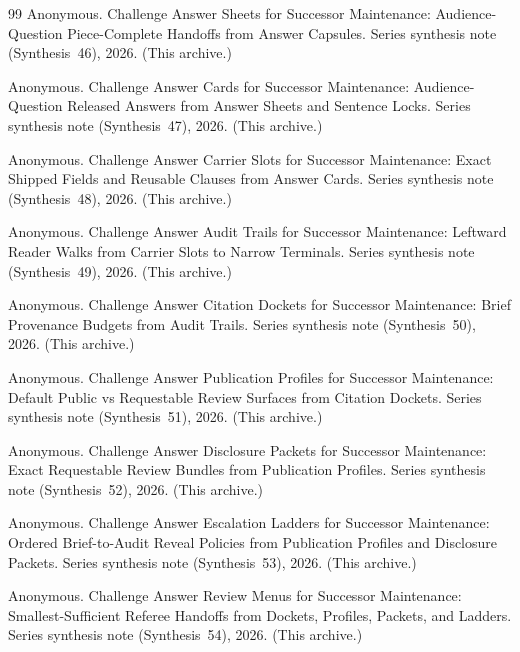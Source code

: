 \documentclass[11pt]{article}
\begin{document}
\begin{thebibliography}{99}
Anonymous.
\newblock Challenge Answer Sheets for Successor Maintenance: Audience-Question Piece-Complete Handoffs from Answer Capsules.
\newblock Series synthesis note (Synthesis~46), 2026. (This archive.)

Anonymous.
\newblock Challenge Answer Cards for Successor Maintenance: Audience-Question Released Answers from Answer Sheets and Sentence Locks.
\newblock Series synthesis note (Synthesis~47), 2026. (This archive.)

Anonymous.
\newblock Challenge Answer Carrier Slots for Successor Maintenance: Exact Shipped Fields and Reusable Clauses from Answer Cards.
\newblock Series synthesis note (Synthesis~48), 2026. (This archive.)

Anonymous.
\newblock Challenge Answer Audit Trails for Successor Maintenance: Leftward Reader Walks from Carrier Slots to Narrow Terminals.
\newblock Series synthesis note (Synthesis~49), 2026. (This archive.)

Anonymous.
\newblock Challenge Answer Citation Dockets for Successor Maintenance: Brief Provenance Budgets from Audit Trails.
\newblock Series synthesis note (Synthesis~50), 2026. (This archive.)

Anonymous.
\newblock Challenge Answer Publication Profiles for Successor Maintenance: Default Public vs Requestable Review Surfaces from Citation Dockets.
\newblock Series synthesis note (Synthesis~51), 2026. (This archive.)

Anonymous.
\newblock Challenge Answer Disclosure Packets for Successor Maintenance: Exact Requestable Review Bundles from Publication Profiles.
\newblock Series synthesis note (Synthesis~52), 2026. (This archive.)

Anonymous.
\newblock Challenge Answer Escalation Ladders for Successor Maintenance: Ordered Brief-to-Audit Reveal Policies from Publication Profiles and Disclosure Packets.
\newblock Series synthesis note (Synthesis~53), 2026. (This archive.)

Anonymous.
\newblock Challenge Answer Review Menus for Successor Maintenance: Smallest-Sufficient Referee Handoffs from Dockets, Profiles, Packets, and Ladders.
\newblock Series synthesis note (Synthesis~54), 2026. (This archive.)


\end{thebibliography}
\end{document}
